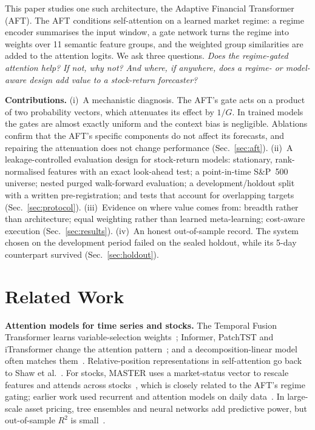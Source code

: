 This paper studies one such architecture, the Adaptive Financial Transformer (AFT). The AFT conditions self-attention on a learned market regime: a regime encoder summarises the input window, a gate network turns the regime into weights over 11 semantic feature groups, and the weighted group similarities are added to the attention logits. We ask three questions. \emph{Does the regime-gated attention help?} \emph{If not, why not?} \emph{And where, if anywhere, does a regime- or model-aware design add value to a stock-return forecaster?}

\textbf{Contributions.}
(i)~A mechanistic diagnosis. The AFT's gate acts on a product of two probability vectors, which attenuates its effect by $1/G$. In trained models the gates are almost exactly uniform and the context bias is negligible. Ablations confirm that the AFT's specific components do not affect its forecasts, and repairing the attenuation does not change performance (Sec.~\ref{sec:aft}).
(ii)~A leakage-controlled evaluation design for stock-return models: stationary, rank-normalised features with an exact look-ahead test; a point-in-time S\&P~500 universe; nested purged walk-forward evaluation; a development/holdout split with a written pre-registration; and tests that account for overlapping targets (Sec.~\ref{sec:protocol}).
(iii)~Evidence on where value comes from: breadth rather than architecture; equal weighting rather than learned meta-learning; cost-aware execution (Sec.~\ref{sec:results}).
(iv)~An honest out-of-sample record. The system chosen on the development period failed on the sealed holdout, while its 5-day counterpart survived (Sec.~\ref{sec:holdout}).

\section{Related Work}
\label{sec:related}
\textbf{Attention models for time series and stocks.} The Temporal Fusion Transformer learns variable-selection weights~\cite{lim2021}; Informer, PatchTST and iTransformer change the attention pattern~\cite{zhou2021,nie2023,liu2024}; and a decomposition-linear model often matches them~\cite{zeng2023}. Relative-position representations in self-attention go back to Shaw et al.~\cite{shaw2018}. For stocks, MASTER uses a market-status vector to rescale features and attends across stocks~\cite{li2024master}, which is closely related to the AFT's regime gating; earlier work used recurrent and attention models on daily data~\cite{fischer2018,ding2020}. In large-scale asset pricing, tree ensembles and neural networks add predictive power, but out-of-sample $R^2$ is small~\cite{gu2020}.

